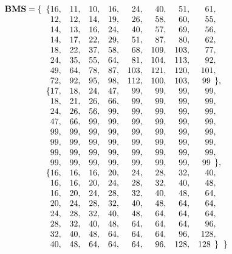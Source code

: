 \documentclass[9pt,letterpaper]{book}
\newcommand{\bitvar}[1]{\ensuremath{\mathbf{\bm{#1}}}}
\numberwithin{equation}{chapter}
\numberwithin{figure}{chapter}
\numberwithin{table}{chapter}
\begin{document}
\begin{align*}
\bitvar{BMS} = \{ & \begin{array}[t]{r@{}rrrrrrrr@{}l}
\{ & 16, & 11, & 10, & 16, &  24, &  40, &  51, &  61,   &       \\
   & 12, & 12, & 14, & 19, &  26, &  58, &  60, &  55,   &       \\
   & 14, & 13, & 16, & 24, &  40, &  57, &  69, &  56,   &       \\
   & 14, & 17, & 22, & 29, &  51, &  87, &  80, &  62,   &       \\
   & 18, & 22, & 37, & 58, &  68, & 109, & 103, &  77,   &       \\
   & 24, & 35, & 55, & 64, &  81, & 104, & 113, &  92,   &       \\
   & 49, & 64, & 78, & 87, & 103, & 121, & 120, & 101,   &       \\
   & 72, & 92, & 95, & 98, & 112, & 100, & 103, &  99\;\ & \!\}, \\
\{ & 17, & 18, & 24, & 47, & 99, & 99, & 99, & 99,   &       \\
   & 18, & 21, & 26, & 66, & 99, & 99, & 99, & 99,   &       \\
   & 24, & 26, & 56, & 99, & 99, & 99, & 99, & 99,   &       \\
   & 47, & 66, & 99, & 99, & 99, & 99, & 99, & 99,   &       \\
   & 99, & 99, & 99, & 99, & 99, & 99, & 99, & 99,   &       \\
   & 99, & 99, & 99, & 99, & 99, & 99, & 99, & 99,   &       \\
   & 99, & 99, & 99, & 99, & 99, & 99, & 99, & 99,   &       \\
   & 99, & 99, & 99, & 99, & 99, & 99, & 99, & 99\;\ & \!\}, \\
\{ & 16, & 16, & 16, & 20, & 24, & 28, &  32, &  40,   &            \\
   & 16, & 16, & 20, & 24, & 28, & 32, &  40, &  48,   &            \\
   & 16, & 20, & 24, & 28, & 32, & 40, &  48, &  64,   &            \\
   & 20, & 24, & 28, & 32, & 40, & 48, &  64, &  64,   &            \\
   & 24, & 28, & 32, & 40, & 48, & 64, &  64, &  64,   &            \\
   & 28, & 32, & 40, & 48, & 64, & 64, &  64, &  96,   &            \\
   & 32, & 40, & 48, & 64, & 64, & 64, &  96, & 128,   &            \\
   & 40, & 48, & 64, & 64, & 64, & 96, & 128, & 128\;\ & \!\}\;\;\} \\
\end{array}
\end{align*}
\end{document}
